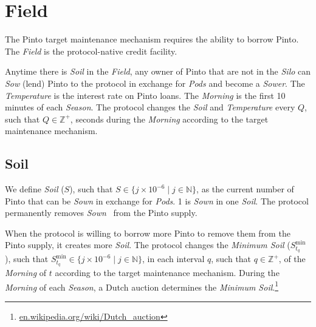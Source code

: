 \documentclass[tikz]{article}
\newcommand{\term}[1]{\textsl{#1}}
\newcommand{\fref}[1]{\footnote{\href{http://#1}{#1}}}
\newcommand{\Pinto}{} %
\renewcommand{\Pinto}{\usebox{\cachePinto}}
\begin{document}


\section{Field}
\vspace{-0.4cm}

The Pinto target maintenance mechanism requires the ability to borrow Pinto. The \term{Field} is the protocol-native credit facility. 

\vspace{-0.2cm}

Anytime there is \term{Soil} in the \term{Field}, any owner of Pinto that are not in the \term{Silo} can \term{Sow} (lend) Pinto to the protocol in exchange for \term{Pods} and become a \term{Sower}. The \term{Temperature} is the interest rate on Pinto loans. The \term{Morning} is the first 10 minutes of each \term{Season}. The protocol changes the \term{Soil} and \term{Temperature} every $Q$, such that $Q \in \mathbb{Z}^{+}$, seconds during the \term{Morning} according to the target maintenance mechanism.


\vspace{-0.35cm}
\subsection{Soil}
\vspace{-0.35cm}

We define \term{Soil} ($S$), such that $S \in \{j \times 10^{-6} \mid j \in \mathbb{N} \}$, as the current number of Pinto that can be \term{Sown} in exchange for \term{Pods}. \Pinto1 is \term{Sown} in one \term{Soil}. The protocol permanently removes \term{Sown} \Pinto\ from the Pinto supply. 

\vspace{-0.2cm}

When the protocol is willing to borrow more Pinto to remove them from the Pinto supply, it creates more \term{Soil}. The protocol changes the \term{Minimum Soil} ($S_{t_{q}}^{\text{min}}$), such that $S_{t_{q}}^{\text{min}} \in \{j \times 10^{-6} \mid j \in \mathbb{N} \}$, in each interval $q$, such that $q \in \mathbb{Z}^{+}$, of the \term{Morning} of $t$ according to the target maintenance mechanism. During the \term{Morning} of each \term{Season}, a Dutch auction determines the \term{Minimum Soil}.\fref{en.wikipedia.org/wiki/Dutch\_auction} 
\end{document}
